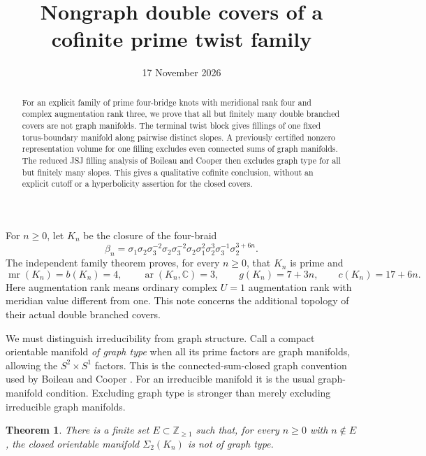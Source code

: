 \documentclass[11pt]{article}
\title{Nongraph double covers of a cofinite prime twist family}
\author{}
\date{17 November 2026}
\newtheorem{theorem}{Theorem}
\newcommand{\Sig}{\Sigma_2}
\newcommand{\mr}{\operatorname{mr}}
\newcommand{\ar}{\operatorname{ar}}
\begin{document}
\maketitle
\begin{abstract}
For an explicit family of prime four-bridge knots with meridional rank
four and complex augmentation rank three, we prove that all but finitely
many double branched covers are not graph manifolds. The terminal twist
block gives fillings of one fixed torus-boundary manifold along pairwise
distinct slopes. A previously certified nonzero representation volume
for one filling excludes even connected sums of graph manifolds.
The reduced JSJ filling analysis of Boileau and Cooper then excludes
graph type for all but finitely many slopes. This gives
a qualitative cofinite conclusion, without an explicit cutoff or a
hyperbolicity assertion for the closed covers.
\end{abstract}

For $n\ge0$, let $K_n$ be the closure of the four-braid
\begin{equation}\label{eq:braid}
 \beta_n=\sigma_1\sigma_2\sigma_3^{-2}\sigma_2
 \sigma_3^{-2}\sigma_2\sigma_1^2\sigma_2^3
 \sigma_3^{-1}\sigma_2^{3+6n}.
\end{equation}
The independent family theorem \cite[Theorem \texttt{thm:main}]{family}
proves, for every $n\ge0$, that $K_n$ is prime and
\begin{equation}\label{eq:family}
 \mr(K_n)=b(K_n)=4,\qquad \ar(K_n,\mathbb C)=3,\qquad
 g(K_n)=7+3n,\qquad c(K_n)=17+6n.
\end{equation}
Here augmentation rank means ordinary complex $U=1$ augmentation
rank with meridian value different from one. This note concerns the
additional topology of their actual double branched covers.

We must distinguish irreducibility from graph structure. Call a compact
orientable manifold \emph{of graph type} when all its prime factors
are graph manifolds, allowing the $S^2\times S^1$ factors.
This is the connected-sum-closed graph convention used by Boileau and
Cooper \cite[printed p.~45]{bc}. For an irreducible manifold it is the
usual graph-manifold condition. Excluding graph type is stronger than
merely excluding irreducible graph manifolds.

\begin{theorem}\label{thm:cofinite}
There is a finite set $E\subset\mathbb Z_{\ge1}$ such that, for every
$n\ge0$ with $n\notin E$, the closed orientable manifold $\Sig(K_n)$
is not of graph type.
\end{theorem}
\end{document}
